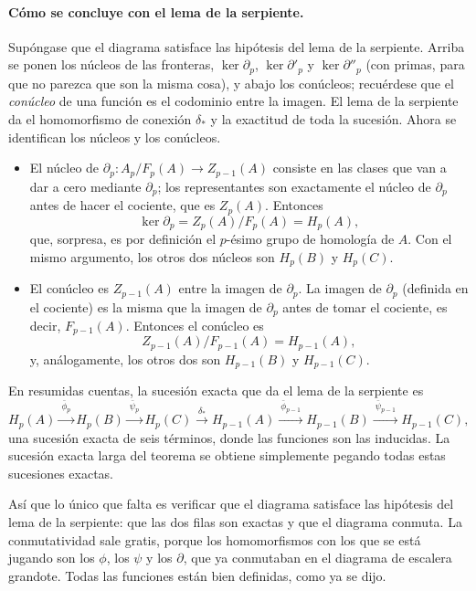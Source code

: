 \documentclass[11pt]{article}
\begin{document}
\paragraph{Cómo se concluye con el lema de la serpiente.} Supóngase que el diagrama satisface las hipótesis del lema de la serpiente. Arriba se ponen los núcleos de las fronteras, $\ker\partial_p$, $\ker\partial'_p$ y $\ker\partial''_p$ (con primas, para que no parezca que son la misma cosa), y abajo los conúcleos; recuérdese que el \emph{conúcleo} de una función es el codominio entre la imagen. El lema de la serpiente da el homomorfismo de conexión $\delta_*$ y la exactitud de toda la sucesión. Ahora se identifican los núcleos y los conúcleos.
\begin{itemize}
  \item El núcleo de $\partial_p\colon A_p/F_p(A)\to Z_{p-1}(A)$ consiste en las clases que van a dar a cero mediante $\partial_p$; los representantes son exactamente el núcleo de $\partial_p$ antes de hacer el cociente, que es $Z_p(A)$. Entonces
  \[
    \ker\partial_p=Z_p(A)/F_p(A)=H_p(A),
  \]
  que, sorpresa, es por definición el $p$-ésimo grupo de homología de $A$. Con el mismo argumento, los otros dos núcleos son $H_p(B)$ y $H_p(C)$.
  \item El conúcleo es $Z_{p-1}(A)$ entre la imagen de $\partial_p$. La imagen de $\partial_p$ (definida en el cociente) es la misma que la imagen de $\partial_p$ antes de tomar el cociente, es decir, $F_{p-1}(A)$. Entonces el conúcleo es
  \[
    Z_{p-1}(A)/F_{p-1}(A)=H_{p-1}(A),
  \]
  y, análogamente, los otros dos son $H_{p-1}(B)$ y $H_{p-1}(C)$.
\end{itemize}
En resumidas cuentas, la sucesión exacta que da el lema de la serpiente es
\[
  H_p(A)\xrightarrow{\ \bar\phi_p\ }H_p(B)\xrightarrow{\ \bar\psi_p\ }H_p(C)\xrightarrow{\ \delta_*\ }H_{p-1}(A)\xrightarrow{\ \bar\phi_{p-1}\ }H_{p-1}(B)\xrightarrow{\ \bar\psi_{p-1}\ }H_{p-1}(C),
\]
una sucesión exacta de seis términos, donde las funciones son las inducidas. La sucesión exacta larga del teorema se obtiene simplemente pegando todas estas sucesiones exactas.

Así que lo único que falta es verificar que el diagrama satisface las hipótesis del lema de la serpiente: que las dos filas son exactas y que el diagrama conmuta. La conmutatividad sale gratis, porque los homomorfismos con los que se está jugando son los $\phi$, los $\psi$ y los $\partial$, que ya conmutaban en el diagrama de escalera grandote. Todas las funciones están bien definidas, como ya se dijo.
\end{document}
